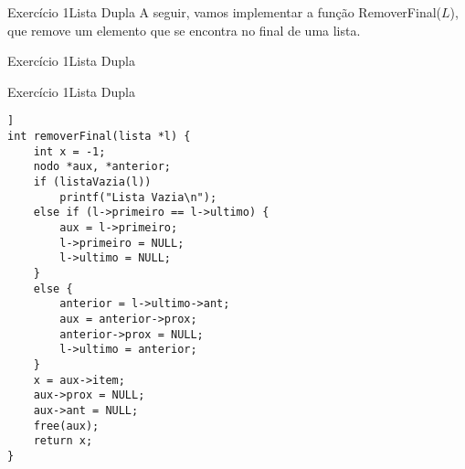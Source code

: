 \documentclass[aspectratio=169]{beamer}
\begin{document}

\begin{frame}[fragile]{Exercício 1}{Lista Dupla}
A seguir, vamos implementar a função RemoverFinal($L$), que remove um elemento que se encontra no final de uma lista.
\end{frame}


\begin{frame}[fragile]{Exercício 1}{Lista Dupla}
\end{frame}


\begin{frame}[fragile]{Exercício 1}{Lista Dupla}
\begin{lstlisting}[style=CStyle,basicstyle=\tiny]]
int removerFinal(lista *l) {
    int x = -1;
    nodo *aux, *anterior;
    if (listaVazia(l)) 
        printf("Lista Vazia\n");
    else if (l->primeiro == l->ultimo) {
        aux = l->primeiro;
        l->primeiro = NULL;
        l->ultimo = NULL;
    }
    else {
        anterior = l->ultimo->ant;
        aux = anterior->prox;
        anterior->prox = NULL;
        l->ultimo = anterior;
    }
    x = aux->item;
    aux->prox = NULL;
    aux->ant = NULL;
    free(aux);
    return x;
}
\end{lstlisting}  
\end{frame}
\end{document}
